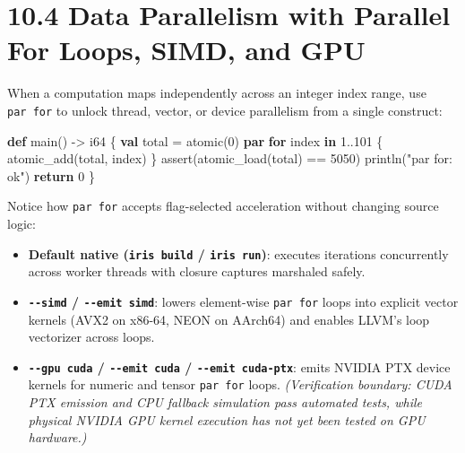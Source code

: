\documentclass[
  english,
  oneside]{book}
\newenvironment{Shaded}{\begin{snugshade}}{\end{snugshade}}
\newcommand{\ControlFlowTok}[1]{\textcolor[rgb]{0.77,0.53,0.75}{\textbf{#1}}}
\newcommand{\DataTypeTok}[1]{\textcolor[rgb]{0.31,0.79,0.69}{#1}}
\newcommand{\DecValTok}[1]{\textcolor[rgb]{0.71,0.81,0.66}{#1}}
\newcommand{\FunctionTok}[1]{\textcolor[rgb]{0.86,0.86,0.67}{#1}}
\newcommand{\KeywordTok}[1]{\textcolor[rgb]{0.34,0.61,0.84}{\textbf{#1}}}
\newcommand{\NormalTok}[1]{\textcolor[rgb]{0.83,0.83,0.83}{#1}}
\newcommand{\OperatorTok}[1]{\textcolor[rgb]{0.83,0.83,0.83}{#1}}
\newcommand{\StringTok}[1]{\textcolor[rgb]{0.81,0.57,0.47}{#1}}
\providecommand{\tightlist}{%
  \setlength{\itemsep}{0pt}\setlength{\parskip}{0pt}}
\begin{document}
\section{10.4 Data Parallelism with Parallel For Loops, SIMD, and
GPU}\label{data-parallelism-with-parallel-for-loops-simd-and-gpu}

When a computation maps independently across an integer index range, use
\texttt{par\ for} to unlock thread, vector, or device parallelism from a
single construct:

\begin{Shaded}
\begin{Highlighting}[]
\KeywordTok{def}\NormalTok{ main() }\OperatorTok{{-}\textgreater{}} \DataTypeTok{i64}\NormalTok{ \{}
    \KeywordTok{val}\NormalTok{ total }\OperatorTok{=} \DataTypeTok{atomic}\NormalTok{(}\DecValTok{0}\NormalTok{)}
    \KeywordTok{par} \ControlFlowTok{for}\NormalTok{ index }\ControlFlowTok{in} \DecValTok{1}\OperatorTok{..}\DecValTok{101}\NormalTok{ \{}
        \FunctionTok{atomic\_add}\NormalTok{(total, index)}
\NormalTok{    \}}
    \FunctionTok{assert}\NormalTok{(}\FunctionTok{atomic\_load}\NormalTok{(total) }\OperatorTok{==} \DecValTok{5050}\NormalTok{)}
\NormalTok{    println(}\StringTok{"par for: ok"}\NormalTok{)}
    \ControlFlowTok{return} \DecValTok{0}
\NormalTok{\}}
\end{Highlighting}
\end{Shaded}

Notice how \texttt{par\ for} accepts flag-selected acceleration without
changing source logic:

\begin{itemize}
\tightlist
\item
  \textbf{Default native (\texttt{iris\ build} / \texttt{iris\ run})}:
  executes iterations concurrently across worker threads with closure
  captures marshaled safely.
\item
  \textbf{\texttt{-\/-simd} / \texttt{-\/-emit\ simd}}: lowers
  element-wise \texttt{par\ for} loops into explicit vector kernels
  (AVX2 on x86-64, NEON on AArch64) and enables LLVM's loop vectorizer
  across loops.
\item
  \textbf{\texttt{-\/-gpu\ cuda} / \texttt{-\/-emit\ cuda} /
  \texttt{-\/-emit\ cuda-ptx}}: emits NVIDIA PTX device kernels for
  numeric and tensor \texttt{par\ for} loops. \emph{(Verification
  boundary: CUDA PTX emission and CPU fallback simulation pass automated
  tests, while physical NVIDIA GPU kernel execution has not yet been
  tested on GPU hardware.)}
\end{itemize}
\end{document}

